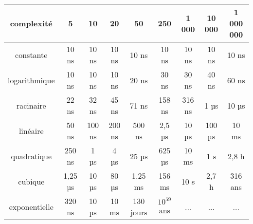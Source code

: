 \documentclass[a4paper,12pt,french]{article}
\begin{document}
\renewcommand{\arraystretch}{1.7}
\begin{center}
\begin{tabular}{|c|c|c|c|c|c|c|c|c|}
\hline
\rowcolor{UGLiOrange}\textbf{\color{white}complexité} & \textbf{\color{white}5} & \textbf{\color{white}10} & \textbf{\color{white}20} & \textbf{\color{white}50} & \textbf{\color{white}250} & \textbf{\color{white}1 000} & \textbf{\color{white}10 000} & \textbf{\color{white}1 000 000} \\
\hline
constante & 10 ns & 10 ns & 10 ns & 10 ns & 10 ns & 10 ns & 10 ns & 10 ns \\
\hline
\rowcolor{blue!10}logarithmique & 10 ns & 10 ns & 10 ns & 20 ns  & 30 ns & 30 ns & 40 ns & 60 ns \\
\hline
racinaire & 22 ns & 32 ns & 45 ns & 71 ns & 158 ns & 316 ns & 1 µs & 10 µs \\
\hline
\rowcolor{blue!10}linéaire & 50 ns & 100 ns & 200 ns & 500 ns & 2,5 µs & 10 µs & 100 µs & 10 ms \\
\hline
quadratique & 250 ns & 1 µs & 4 µs & 25 µs & 625 µs & 10 ms & 1 s & 2,8 h \\
\hline
\rowcolor{blue!10}cubique & 1,25 µs & 10 µs & 80 µs & 1.25 ms & 156 ms & 10 s & 2,7 h & 316 ans \\
\hline
exponentielle & 320 ns & 10 µs & 10 ms & 130 jours & $10^{59}$ ans & ... & ... & ... \\
\hline
\end{tabular}
\end{center}
\end{document}
